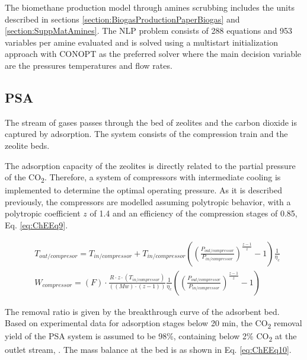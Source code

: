 \begin{refsection}[referencesCh7]
The biomethane production model through amines scrubbing includes the units described in sections \ref{section:BiogasProductionPaperBiogas} and \ref{section:SuppMatAmines}. The NLP problem consists of 288 equations and 953 variables per amine evaluated and is solved using a multistart initialization approach with CONOPT as the preferred solver where the main decision variable are the pressures temperatures and flow rates.

\subsection{PSA} \label{section:SuppMatPSA}
The stream of gases passes through the bed of zeolites and the carbon dioxide is captured by adsorption. The system consists of the compression train and the zeolite beds. 

The adsorption capacity of the zeolites is directly related to the partial pressure of the CO\textsubscript{2}. Therefore, a system of compressors with intermediate cooling is implemented to determine the optimal operating pressure. As it is described previously, the compressors are modelled assuming polytropic behavior, with a polytropic coefficient $z$ of 1.4 and an efficiency of the compression stages of 0.85, Eq. \ref{eq:ChEEq9}. 

\begin{align}
&{T_{out/compresor}} = {T_{in/compressor}} + {T_{in/compressor}}\left( {{{\left( {\frac{{{P_{out/compressor}}}}{{{P_{in/compressor}}}}} \right)}^{\frac{{z - 1}}{z}}} - 1} \right)\frac{1}{{{\eta _c}}}\\
&{{{W}}_{compressor}} = \left( F \right)\cdot\frac{{R\cdot z\cdot\left( {{{{T}}_{in/compressor}}} \right)}}{{\left( {\left( {{{M}}w} \right)\cdot\left( {z - {{1}}} \right)} \right)}}\frac{1}{{{\eta _c}}}\left( {{{\left( {\frac{{{P_{out/compressor}}}}{{{P_{in/compressor}}}}} \right)}^{\frac{{z - 1}}{z}}} - {{1}}} \right) \label{eq:ChEEq9}
\end{align}

The removal ratio is given by the breakthrough curve of the adsorbent bed. Based on experimental data \citep{hauchhum2014carbon} for adsorption stages below 20 min, the CO\textsubscript{2} removal yield of the PSA system is assumed to be 98\%, containing below 2\% CO\textsubscript{2} at the outlet stream, \citep{ferella2017separation}. The mass balance at the bed is as shown in Eq. \ref{eq:ChEEq10}.


\end{refsection}
